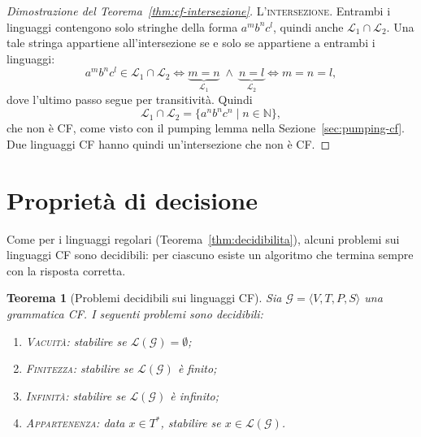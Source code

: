 \documentclass[a4paper, 11pt, oneside]{book}
\theoremstyle{formale}
\newtheorem{theorem}{Teorema}
\begin{document}
\begin{proof}[Dimostrazione del Teorema~\ref{thm:cf-intersezione}]
        \textsc{L'intersezione}. Entrambi i linguaggi contengono solo stringhe della
        forma $a^m b^n c^l$, quindi anche $\mathcal{L}_1 \cap \mathcal{L}_2$. Una tale
        stringa appartiene all'intersezione se e solo se appartiene a entrambi i
        linguaggi:
        \begin{equation*}
            a^m b^n c^l \in \mathcal{L}_1 \cap \mathcal{L}_2
            \iff \underbrace{m = n}_{\mathcal{L}_1} \;\land\;
            \underbrace{n = l}_{\mathcal{L}_2}
            \iff m = n = l,
        \end{equation*}
        dove l'ultimo passo segue per transitivit\`a. Quindi
        \begin{equation*}
            \mathcal{L}_1 \cap \mathcal{L}_2 = \{a^n b^n c^n \mid n \in \mathbb{N}\},
        \end{equation*}
        che non \`e CF, come visto con il pumping lemma nella
        Sezione~\ref{sec:pumping-cf}. Due linguaggi CF hanno quindi un'intersezione che
        non \`e CF.
    \end{proof}

    \section{Propriet\`a di decisione}
    \label{sec:decisione-cf}
    Come per i linguaggi regolari (Teorema~\ref{thm:decidibilita}), alcuni problemi sui
    linguaggi CF sono decidibili: per ciascuno esiste un algoritmo che termina sempre con
    la risposta corretta.

    \begin{theorem}[Problemi decidibili sui linguaggi CF]
        \label{thm:decidibilita-cf}
        Sia $\mathcal{G} = \langle V, T, P, S \rangle$ una grammatica CF. I seguenti
        problemi sono decidibili:
        \begin{enumerate}[label=\textup{(\alph*)}]
            \item \textup{\textsc{Vacuit\`a}}: stabilire se
                $\mathcal{L}(\mathcal{G}) = \emptyset$;
            \item \textup{\textsc{Finitezza}}: stabilire se $\mathcal{L}(\mathcal{G})$ \`e
                finito;
            \item \textup{\textsc{Infinit\`a}}: stabilire se $\mathcal{L}(\mathcal{G})$
                \`e infinito;
            \item \textup{\textsc{Appartenenza}}: data $x \in T^*$, stabilire se
                $x \in \mathcal{L}(\mathcal{G})$.
        \end{enumerate}
    \end{theorem}
\end{document}
